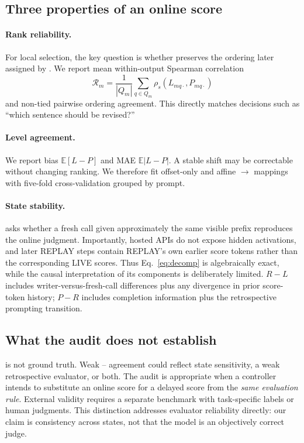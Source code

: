 \subsection{Three properties of an online score}
\paragraph{Rank reliability.}
For local selection, the key question is whether \live{} preserves the ordering later assigned by \post{}. We report mean within-output Spearman correlation
\begin{equation}
\mathcal{R}_m=\frac{1}{|Q_m|}\sum_{q\in Q_m}\rho_s(L_{mq\cdot},P_{mq\cdot})
\end{equation}
and non-tied pairwise ordering agreement. This directly matches decisions such as ``which sentence should be revised?''

\paragraph{Level agreement.}
We report bias $\mathbb{E}[L-P]$ and MAE $\mathbb{E}|L-P|$. A stable shift may be correctable without changing ranking. We therefore fit offset-only and affine \live{}$\rightarrow$\post{} mappings with five-fold cross-validation grouped by prompt.

\paragraph{State stability.}
\replay{} asks whether a fresh call given approximately the same visible prefix reproduces the online judgment. Importantly, hosted APIs do not expose hidden activations, and later REPLAY steps contain REPLAY's own earlier score tokens rather than the corresponding LIVE scores. Thus Eq.~\ref{eq:decomp} is algebraically exact, while the causal interpretation of its components is deliberately limited. $R-L$ includes writer-versus-fresh-call differences plus any divergence in prior score-token history; $P-R$ includes completion information plus the retrospective prompting transition.

\subsection{What the audit does not establish}
\post{} is not ground truth. Weak \live{}--\post{} agreement could reflect state sensitivity, a weak retrospective evaluator, or both. The audit is appropriate when a controller intends to substitute an online score for a delayed score from the \emph{same evaluation rule}. External validity requires a separate benchmark with task-specific labels or human judgments. This distinction addresses evaluator reliability directly: our claim is consistency across states, not that the model is an objectively correct judge.

